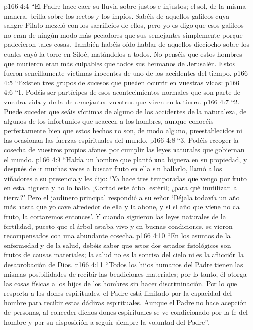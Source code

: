 \vs p166 4:4 “El Padre hace caer su lluvia sobre justos e injustos; el sol, de la misma manera, brilla sobre los rectos y los impíos. Sabéis de aquellos galileos cuya sangre Pilato mezcló con los sacrificios de ellos, pero yo os digo que esos galileos no eran de ningún modo más pecadores que sus semejantes simplemente porque padecieron tales cosas. También habéis oído hablar de aquellos dieciocho sobre los cuales cayó la torre en Siloé, matándolos a todos. No penséis que estos hombres que murieron eran más culpables que todos sus hermanos de Jerusalén. Estos fueron sencillamente víctimas inocentes de uno de los accidentes del tiempo.
\vs p166 4:5 “Existen tres grupos de sucesos que pueden ocurrir en vuestras vidas:
\vs p166 4:6 “1. Podéis ser partícipes de esos acontecimientos normales que son parte de vuestra vida y de la de semejantes vuestros que viven en la tierra.
\vs p166 4:7 “2. Puede suceder que seáis víctimas de alguno de los accidentes de la naturaleza, de algunos de los infortunios que acaecen a los hombres, aunque conocéis perfectamente bien que estos hechos no son, de modo alguno, preestablecidos ni las ocasionan las fuerzas espirituales del mundo.
\vs p166 4:8 “3. Podéis recoger la cosecha de vuestros propios afanes por cumplir las leyes naturales que gobiernan el mundo.
\vs p166 4:9 \pc “Había un hombre que plantó una higuera en su propiedad, y después de ir muchas veces a buscar fruto en ella sin hallarlo, llamó a los viñadores a su presencia y les dijo: ‘Ya hace tres temporadas que vengo por fruto en esta higuera y no lo hallo. ¡Cortad este árbol estéril; ¿para qué inutilizar la tierra?’ Pero el jardinero principal respondió a su señor ‘Déjala todavía un año más hasta que yo cave alrededor de ella y la abone, y si el año que viene no da fruto, la cortaremos entonces’. Y cuando siguieron las leyes naturales de la fertilidad, puesto que el árbol estaba vivo y en buenas condiciones, se vieron recompensados con una abundante cosecha.
\vs p166 4:10 “En los asuntos de la enfermedad y de la salud, debéis saber que estos dos estados fisiológicos son frutos de causas materiales; la salud no es la sonrisa del cielo ni es la aflicción la desaprobación de Dios.
\vs p166 4:11 “Todos los hijos humanos del Padre tienen las mismas posibilidades de recibir las bendiciones materiales; por lo tanto, él otorga las cosas físicas a los hijos de los hombres sin hacer discriminación. Por lo que respecta a los dones espirituales, el Padre está limitado por la capacidad del hombre para recibir estas dádivas espirituales. Aunque el Padre no hace acepción de personas, al conceder dichos dones espirituales se ve condicionado por la fe del hombre y por su disposición a seguir siempre la voluntad del Padre”.
